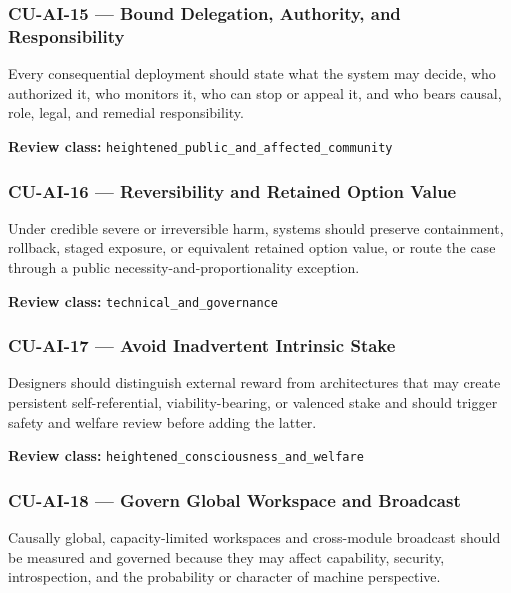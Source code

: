 \documentclass[
  11pt,
]{article}
\begin{document}
\subsubsection{CU-AI-15 --- Bound Delegation, Authority, and
Responsibility}\label{cu-ai-15-bound-delegation-authority-and-responsibility}

Every consequential deployment should state what the system may decide,
who authorized it, who monitors it, who can stop or appeal it, and who
bears causal, role, legal, and remedial responsibility.

\textbf{Review class:}
\texttt{heightened\_public\_and\_affected\_community}

\subsubsection{CU-AI-16 --- Reversibility and Retained Option
Value}\label{cu-ai-16-reversibility-and-retained-option-value}

Under credible severe or irreversible harm, systems should preserve
containment, rollback, staged exposure, or equivalent retained option
value, or route the case through a public necessity-and-proportionality
exception.

\textbf{Review class:} \texttt{technical\_and\_governance}

\subsubsection{CU-AI-17 --- Avoid Inadvertent Intrinsic
Stake}\label{cu-ai-17-avoid-inadvertent-intrinsic-stake}

Designers should distinguish external reward from architectures that may
create persistent self-referential, viability-bearing, or valenced stake
and should trigger safety and welfare review before adding the latter.

\textbf{Review class:} \texttt{heightened\_consciousness\_and\_welfare}

\subsubsection{CU-AI-18 --- Govern Global Workspace and
Broadcast}\label{cu-ai-18-govern-global-workspace-and-broadcast}

Causally global, capacity-limited workspaces and cross-module broadcast
should be measured and governed because they may affect capability,
security, introspection, and the probability or character of machine
perspective.
\end{document}

